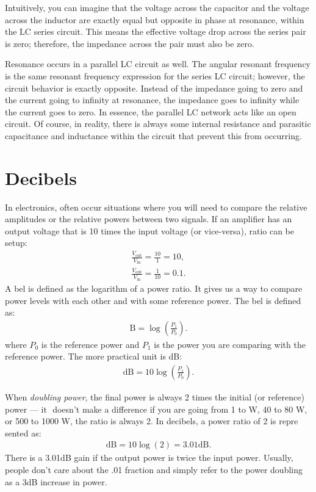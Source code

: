 \documentclass[../../document]{subfiles}
\begin{document}
Intuitively, you can imagine that the voltage across the capacitor and the
voltage across the inductor are exactly equal but opposite in phase at
resonance, within the LC series circuit. This means the effective voltage drop
across the series pair is zero; therefore, the impedance across the pair must
also be zero. \cite{practical_electronics}

Resonance occurs in a parallel LC circuit as well. The angular resonant
frequency is the same resonant frequency expression for the series LC circuit;
however, the circuit behavior is exactly opposite. Instead of the impedance
going to zero and the current going to infinity at resonance, the impedance
goes to infinity while the current goes to zero. In essence, the parallel LC
network acts like an open circuit. Of course, in reality, there is always some
internal resistance and parasitic capacitance and inductance within the circuit
that prevent this from occurring. \cite{practical_electronics}

\section{Decibels}
In electronics, often occur situations where you will need to compare the
relative amplitudes or the relative powers between two signals. If an amplifier
has an output voltage that is 10 times the input voltage (or vice-versa), ratio
can be setup:
\begin{gather}
	\frac{V_{\text{out}}}{V_{\text{in}}} = \frac{10}{1} = 10, \tag{gain}\\
	\frac{V_{\text{out}}}{V_{\text{in}}} = \frac{1}{10} = 0.1. \tag{attenuation}
\end{gather} 
A bel is defined as the logarithm of a power ratio. It gives us a
way to compare power levels with each other and with some reference power. The
bel is defined as:
\begin{gather}
	\unit{\bel} = \log\left(\frac{P_1}{P_0}\right).
\end{gather}
where \(P_0\) is the reference power and \(P_1\) is the power you are comparing
with the reference power. The more practical unit is \unit{\deci\bel}:
\cite{practical_electronics}
\begin{gather}
	\unit{\deci\bel} = 10\log\left(\frac{P_1}{P_0}\right).
\end{gather}

When \emph{doubling power}, the final power is always 2 times the initial (or
reference) power --- it ­ doesn’t make a difference if you are going from 1 to
\unit{\watt}, 40 to 80 \unit{\watt}, or 500 to 1000 \unit{\watt}, the ratio is
always 2. In decibels, a power ratio of 2 is repre sented as:
\begin{gather}
	\unit{\deci\bel} = 10\log\left(2\right) = 3.01\unit{\deci\bel}.
\end{gather}
There is a 3.01\unit{\deci\bel} gain if the output power is twice the input
power. Usually, people don’t care about the .01 fraction and simply refer to
the power doubling as a 3\unit{\deci\bel} increase in power.
\cite{practical_electronics}
\end{document}
